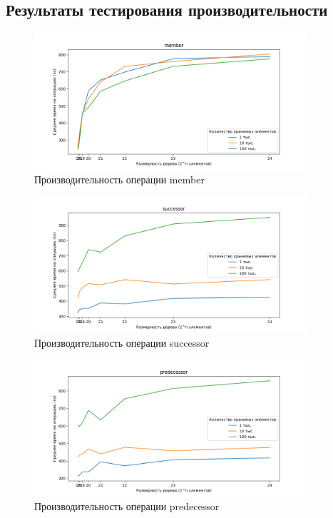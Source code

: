 \documentclass{article}
\begin{document}
\subsection{Результаты тестирования производительности}
\begin{figure}[H]
    \centering
    \includegraphics[width=0.9\textwidth]{plots/member.png}
    \caption{Производительность операции member}
\end{figure}
\begin{figure}[H]
    \centering
    \includegraphics[width=0.9\textwidth]{plots/successor.png}
    \caption{Производительность операции successor}
\end{figure}
\begin{figure}[H]
    \centering
    \includegraphics[width=0.9\textwidth]{plots/predecessor.png}
    \caption{Производительность операции predecessor}
\end{figure}
\end{document}
